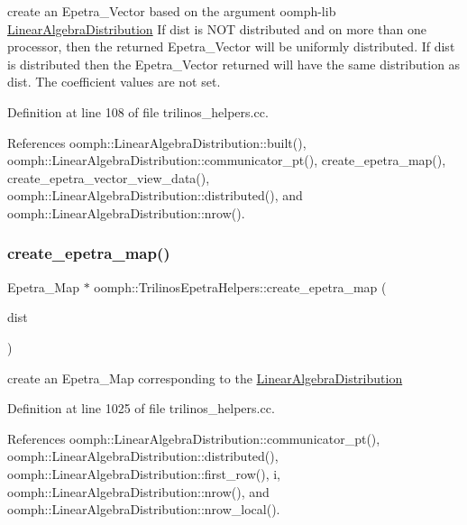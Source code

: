 create an Epetra\+\_\+\+Vector based on the argument oomph-\/lib \hyperlink{classoomph_1_1LinearAlgebraDistribution}{Linear\+Algebra\+Distribution} If dist is N\+OT distributed and on more than one processor, then the returned Epetra\+\_\+\+Vector will be uniformly distributed. If dist is distributed then the Epetra\+\_\+\+Vector returned will have the same distribution as dist. The coefficient values are not set. 



Definition at line 108 of file trilinos\+\_\+helpers.\+cc.



References oomph\+::\+Linear\+Algebra\+Distribution\+::built(), oomph\+::\+Linear\+Algebra\+Distribution\+::communicator\+\_\+pt(), create\+\_\+epetra\+\_\+map(), create\+\_\+epetra\+\_\+vector\+\_\+view\+\_\+data(), oomph\+::\+Linear\+Algebra\+Distribution\+::distributed(), and oomph\+::\+Linear\+Algebra\+Distribution\+::nrow().

\mbox{\label{namespaceoomph_1_1TrilinosEpetraHelpers_a5ccd0dec0ba044834119416b0ed06a2f}} 
\subsubsection{\texorpdfstring{create\+\_\+epetra\+\_\+map()}{create\_epetra\_map()}}
{\footnotesize\ttfamily Epetra\+\_\+\+Map $\ast$ oomph\+::\+Trilinos\+Epetra\+Helpers\+::create\+\_\+epetra\+\_\+map (\begin{DoxyParamCaption}\item[{const \hyperlink{classoomph_1_1LinearAlgebraDistribution}{Linear\+Algebra\+Distribution} $\ast$const}]{dist }\end{DoxyParamCaption})}



create an Epetra\+\_\+\+Map corresponding to the \hyperlink{classoomph_1_1LinearAlgebraDistribution}{Linear\+Algebra\+Distribution} 



Definition at line 1025 of file trilinos\+\_\+helpers.\+cc.



References oomph\+::\+Linear\+Algebra\+Distribution\+::communicator\+\_\+pt(), oomph\+::\+Linear\+Algebra\+Distribution\+::distributed(), oomph\+::\+Linear\+Algebra\+Distribution\+::first\+\_\+row(), i, oomph\+::\+Linear\+Algebra\+Distribution\+::nrow(), and oomph\+::\+Linear\+Algebra\+Distribution\+::nrow\+\_\+local().



